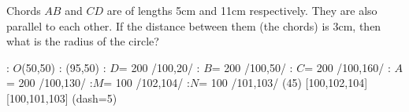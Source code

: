 
%
%
%
%
% 
% 

\question[3] Chords $AB$ and $CD$ are of lengths 5cm and 11cm respectively. They are also 
parallel to each other. If the distance between them (the chords) is 3cm, then what is 
the radius of the circle? 


  \begin{marginfigure}
      : $O$(50,50)
      : (95,50) %
      : $D$= 200 /100,20/
      : $B$= 200 /100,50/
      : $C$= 200 /100,160/
      : $A$= 200 /100,130/
      :$M$= 100 /102,104/
      :$N$= 100 /101,103/
    \figdrawbegin{}
      (45)
      \figdrawline [101,103]
      \figdrawline [102,104]
       [100,102,104]
       [100,101,103]
      \ifprintanswers
        \figset (dash=5)
        \figdrawline [100,101]
        \figdrawline [100,102]
      \fi
    \figdrawend
    \centerline{\box\figBoxA}
  \end{marginfigure}

